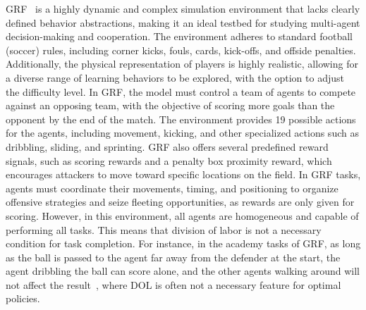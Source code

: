 GRF~\cite{kurach2020google} is a highly dynamic and complex simulation environment that lacks clearly defined behavior abstractions, making it an ideal testbed for studying multi-agent decision-making and cooperation.
The environment adheres to standard football (soccer) rules, including corner kicks, fouls, cards, kick-offs, and offside penalties.
Additionally, the physical representation of players is highly realistic, allowing for a diverse range of learning behaviors to be explored, with the option to adjust the difficulty level.
In GRF, the model must control a team of agents to compete against an opposing team, with the objective of scoring more goals than the opponent by the end of the match.
The environment provides 19 possible actions for the agents, including movement, kicking, and other specialized actions such as dribbling, sliding, and sprinting.
GRF also offers several predefined reward signals, such as scoring rewards and a penalty box proximity reward, which encourages attackers to move toward specific locations on the field.
In GRF tasks, agents must coordinate their movements, timing, and positioning to organize offensive strategies and seize fleeting opportunities, as rewards are only given for scoring.
However, in this environment, all agents are homogeneous and capable of performing all tasks.
This means that division of labor is not a necessary condition for task completion.
For instance, in the academy tasks of GRF, as long as the ball is passed to the agent far away from the defender at the start, the agent dribbling the ball can score alone, and the other agents walking around will not affect the result~\cite{fu2024iteratively,li2021celebrating,xu2023group}, where DOL is often not a necessary feature for optimal policies.